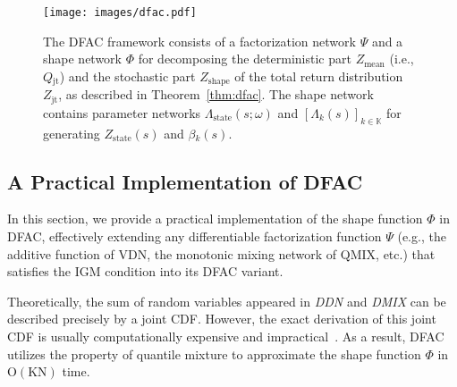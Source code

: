 \documentclass{article}
\newcommand{\state}{s}
\newcommand{\agentspace}{\mathbb{K}}
\newcommand{\agentcounter}{k}
\newcommand{\numberofagents}{\mathrm{K}}
\newcommand{\utilityexp}{Q}
\newcommand{\utility}{Z}
\newcommand{\joint}{\mathrm{jt}}
\newcommand{\quantile}{\omega}
\newcommand{\modelparameter}{\beta}
\newcommand{\numberofquantiles}{\mathrm{N}}
\newcommand{\meandecompositionfunction}{\Psi}
\newcommand{\shapedecompositionfunction}{\Phi}
\newcommand{\additionalparameterfunction}{\Lambda}
\newcommand{\ddn}{\textit{DDN}}
\newcommand{\dmix}{\textit{DMIX}}
\begin{document}
\begin{figure*}[t]
\texttt{[image: images/dfac.pdf]}
\caption{The DFAC framework consists of a factorization network $\meandecompositionfunction{}$ and a shape network $\shapedecompositionfunction$ for decomposing the deterministic part $\utility{}_{\text{mean}}$ (i.e., $\utilityexp{}_{\joint{}}$) and the stochastic part $\utility{}_{\text{shape}}$ of the total return distribution $\utility{}_{\joint{}}$, as described in Theorem~\ref{thm:dfac}. The shape network contains parameter networks $\additionalparameterfunction_{\text{state}}(\state{};\quantile{})$ and $[\additionalparameterfunction_{\agentcounter}(\state{})]_{\agentcounter{}\in\agentspace{}}$ for generating  $\utility_{\text{state}}(\state{})$ and $\modelparameter{}_{\agentcounter}(s)$.}
\label{fig:dfac}
\end{figure*}
 
\subsection{A Practical Implementation of DFAC}
\label{subsec:methodology_a_practical_implementation_of_dfac}

In this section, we provide a practical implementation of the shape function $\shapedecompositionfunction$ in DFAC, effectively extending any differentiable factorization function $\meandecompositionfunction{}$ (e.g., the additive function of VDN, the monotonic mixing network of QMIX, etc.) that satisfies the IGM condition into its DFAC variant.

Theoretically, the sum of random variables appeared in \ddn{} and \dmix{} can be described precisely by a joint CDF. However, the exact derivation of this joint CDF is usually computationally expensive and impractical~\cite{Lin2019DR-DRL}. As a result, DFAC utilizes the property of quantile mixture to approximate the shape function $\shapedecompositionfunction{}$ in $\mathrm{O}(\numberofagents\numberofquantiles)$ time.
\end{document}

